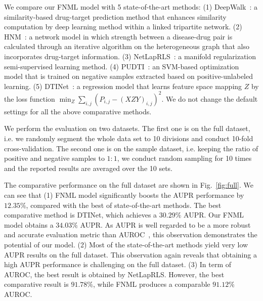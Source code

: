 \documentclass[sigconf,anonymous]{acmart}
\begin{document}
We compare our FNML model with 5 state-of-the-art methods: (1) DeepWalk~\cite{Zong2017Deep}: a similarity-based drug-target prediction method that enhances similarity computation by deep learning method within a linked tripartite network. (2) HNM~\cite{Wang2014Drug}: a network model in which strength between a disease-drug pair is calculated through an iterative algorithm on the heterogeneous graph that also incorporates drug-target information. (3) NetLapRLS~\cite{Xia2010Semi}: a manifold regularization semi-supervised learning method. (4) PUDTI~\cite{Peng2017Screening}: an SVM-based optimization model that is trained on negative samples extracted based on positive-unlabeled learning. (5) DTINet~\cite{Luo2017Network}: a regression model that learns feature space mapping $Z$ by the loss function  $\min_{Z} \sum_{i,j}(P_{i,j}-(XZY)_{i,j})^2$. We do not change the default settings for all the above comparative methods.


We perform the evaluation on two datasets. The first one is on the full dataset, i.e. we randomly segment the whole data set to 10 divisions and conduct 10-fold cross-validation. The second one is on the sample dataset, i.e. keeping the ratio of positive and negative samples to $1:1$, we conduct random sampling for 10 times and the reported results are averaged over the 10 sets. 

The comparative performance on the full dataset are shown in Fig.~\ref{fig:full}. We can see that (1) FNML model significantly boosts the AUPR performance by $12.35\%$, compared with the best of state-of-the-art methods. The best comparative method is DTINet, which achieves a $30.29\%$ AUPR. Our FNML model obtains a $34.03\%$ AUPR. As AUPR is well regarded to be a more robust and accurate evaluation metric than AUROC~\cite{Luo2017Network}, this observation demonstrates the potential of our model. (2) Most of the state-of-the-art methods yield very low AUPR results on the full dataset. This observation again reveals that obtaining a high AUPR performance is challenging on the full dataset. (3) In term of AUROC, the best result is obtained by NetLapRLS. However, the best comparative result is $91.78\%$, while FNML produces a comparable $91.12\%$ AUROC. 
\end{document}
